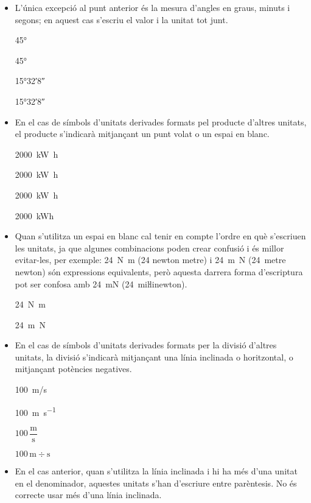 \begin{itemize}
\item  L'única excepció al punt anterior és la mesura d'angles en graus, minuts i segons; en aquest cas s'escriu el valor i la unitat tot junt.

\textcolor{Green}\faCheckSquare{} \ang{45}

\textcolor{Red}\faTimesCircle{} \ang[number-angle-product = \,]{45}

\textcolor{Green}\faCheckSquare{} \ang{15;32;8}

\textcolor{Red}\faTimesCircle{} \ang[number-angle-product = \,]{15;32;8}

\item En el cas de símbols d'unitats derivades formats pel producte
d'altres unitats, el producte s'indicarà mitjançant un punt volat o
un espai en blanc.

\textcolor{Green}\faCheckSquare{} \qty[inter-unit-product=\cdot]{2000}{kW.h}

\textcolor{Green}\faCheckSquare{} \qty{2000}{kW.h}

\textcolor{Red}\faTimesCircle{} \qty[inter-unit-product=-]{2000}{kW.h}

\textcolor{Red}\faTimesCircle{} \qty{2000}{kWh}

\item Quan s'utilitza un espai en blanc cal tenir en compte  l'ordre en què s'escriuen
les unitats, ja que algunes combinacions poden crear confusió i
és millor evitar-les, per exemple: \qty{24}{N.m} (24 newton metre) i
\qty{24}{m.N} (24~metre newton) són expressions equivalents, però
aquesta darrera forma d'escriptura pot ser confosa amb \qty{24}{mN} (24~miŀlinewton).

\textcolor{Green}\faCheckSquare{}  \qty{24}{N.m}

\textcolor{Blue}\faExclamationTriangle{} \qty{24}{m.N}

\item En el cas de símbols d'unitats derivades formats per la divisió
d'altres unitats, la divisió s'indicarà mitjançant una línia
inclinada o horitzontal, o mitjançant potències negatives.

\textcolor{Green}\faCheckSquare{} \qty{100}{m/s}

\textcolor{Green}\faCheckSquare{} \qty{100}{m.s^{-1}}

\textcolor{Green}\faCheckSquare{} $100\,\dfrac{\text{m}}{\text{s}}$

\textcolor{Red}\faTimesCircle{} $100\,\text{m}\div\text{s}$

\item En el cas anterior, quan s'utilitza la línia inclinada i hi ha més
d'una unitat en el denominador, aquestes unitats s'han d'escriure
entre parèntesis. No és correcte usar més d'una línia inclinada.


\end{itemize}
